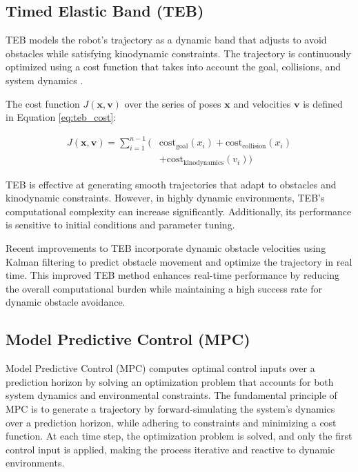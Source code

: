 \documentclass[conference]{IEEEtran}
\begin{document}
\subsection{Timed Elastic Band (TEB)}
TEB models the robot’s trajectory as a dynamic band that adjusts to avoid obstacles while satisfying kinodynamic constraints. The trajectory is continuously optimized using a cost function that takes into account the goal, collisions, and system dynamics \cite{inproceedings}.

The cost function \(J(\mathbf{x}, \mathbf{v})\) over the series of poses \(\mathbf{x}\) and velocities \(\mathbf{v}\) is defined in Equation \eqref{eq:teb_cost}:

\begin{equation}
\label{eq:teb_cost}
\begin{aligned}
J(\mathbf{x}, \mathbf{v}) = \sum_{i=1}^{n-1} \big( & \text{cost}_{\text{goal}}(x_i) + \text{cost}_{\text{collision}}(x_i) \\
& + \text{cost}_{\text{kinodynamics}}(v_i) \big)
\end{aligned}
\end{equation}

TEB is effective at generating smooth trajectories that adapt to obstacles and kinodynamic constraints. However, in highly dynamic environments, TEB's computational complexity can increase significantly. Additionally, its performance is sensitive to initial conditions and parameter tuning.

Recent improvements to TEB incorporate dynamic obstacle velocities using Kalman filtering to predict obstacle movement and optimize the trajectory in real time. This improved TEB method \cite{pr12050984} enhances real-time performance by reducing the overall computational burden while maintaining a high success rate for dynamic obstacle avoidance.

\subsection{Model Predictive Control (MPC)}

Model Predictive Control (MPC) computes optimal control inputs over a prediction horizon by solving an optimization problem that accounts for both system dynamics and environmental constraints. The fundamental principle of MPC is to generate a trajectory by forward-simulating the system’s dynamics over a prediction horizon, while adhering to constraints and minimizing a cost function. At each time step, the optimization problem is solved, and only the first control input is applied, making the process iterative and reactive to dynamic environments.
\end{document}
